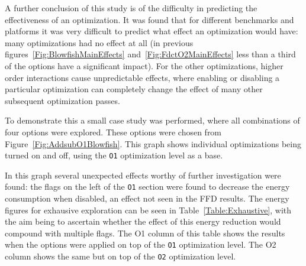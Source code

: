 \documentclass[twocolumn]{article}
\begin{document}
A further conclusion of this study is of the difficulty in predicting the effectiveness of an optimization. It was found that for different benchmarks and platforms it was very difficult to predict what effect an optimization would have: many optimizations had no effect at all (in previous figures~\ref{Fig:BlowfishMainEffects} and~\ref{Fig:FdctO2MainEffects} less than a third of the options have a significant impact). For the other optimizations, higher order interactions cause unpredictable effects, where enabling or disabling a particular optimization can completely change the effect of many other subsequent optimization passes.

To demonstrate this a small case study was performed, where all combinations of four options were explored. These options were chosen from Figure~\ref{Fig:AddsubO1Blowfish}. This graph shows individual optimizations being turned on and off, using the \texttt{O1} optimization level as a base.


In this graph several unexpected effects worthy of further investigation were found: the flags on the left of the \texttt{O1} section were found to decrease the energy consumption when disabled, an effect not seen in the FFD results. The energy figures for exhausive exploration can be seen in Table~\ref{Table:Exhaustive}, with the aim being to ascertain whether the effect of this energy reduction would compound with multiple flags. The O1 column of this table shows the results when the options were applied on top of the \texttt{O1} optimization level. The O2 column shows the same but on top of the \texttt{O2} optimization level.


\end{document}
